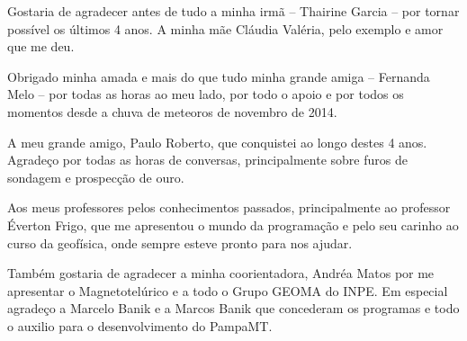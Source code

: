 \documentclass[12pt,twoside,oneright,a4paper,chapter=TITLE,english,brazil]{unipampa}
\begin{document}
\begin{agradecimentos}
    Gostaria de agradecer antes de tudo a minha irmã -- Thairine Garcia -- por tornar possível os últimos 4 anos. A minha mãe Cláudia Valéria, pelo exemplo e amor que me deu.
    
    \SingleSpacing
    \OnehalfSpacing
    
    \noindent Obrigado minha amada e mais do que tudo minha grande amiga -- Fernanda Melo -- por todas as horas ao meu lado, por todo o apoio e por todos os momentos desde a chuva de meteoros de novembro de 2014.
    
    
    \SingleSpacing
    \OnehalfSpacing
    
    \noindent A meu grande amigo, Paulo Roberto, que conquistei ao longo destes 4 anos. Agradeço por todas as horas de conversas, principalmente sobre furos de sondagem e prospecção de ouro.  
    
    \SingleSpacing
    \OnehalfSpacing
    
    
    \noindent Aos meus professores pelos conhecimentos passados, principalmente ao professor Éverton Frigo, que me apresentou o mundo da programação e pelo seu carinho ao curso da geofísica, onde sempre esteve pronto para nos ajudar. 
    
    \SingleSpacing
    \OnehalfSpacing
    
    
    \noindent Também gostaria de agradecer a minha coorientadora, Andréa Matos por me apresentar o Magnetotelúrico e a todo o Grupo GEOMA do INPE. Em especial agradeço a Marcelo Banik e a Marcos Banik que concederam os programas e todo o auxilio para o desenvolvimento do PampaMT.
    

\end{agradecimentos}
\end{document}
